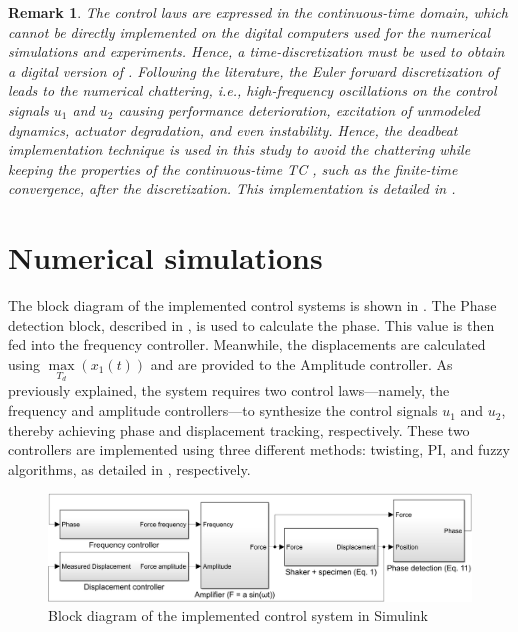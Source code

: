 \documentclass[lettersize,journal]{IEEEtran}
\newtheorem{remark}{Remark}
\begin{document}
\begin{remark} \label{R_chattering}
    The control laws  are expressed in the continuous-time domain, which cannot be directly implemented on the digital computers used for the numerical simulations and experiments. Hence, a time-discretization must be used to obtain a digital version of . Following the literature, the Euler forward discretization of  leads to the numerical chattering, {\em i.e.}, high-frequency oscillations on the control signals $u_1$ and $u_2$ causing performance deterioration, excitation of unmodeled dynamics, actuator degradation, and even instability. Hence, the deadbeat implementation technique \cite{MOJALLIZADEH_Franklin} is used in this study to avoid the chattering while keeping the properties of the continuous-time TC , such as the finite-time convergence, after the discretization. This implementation is detailed in .
\end{remark}


\section{Numerical simulations} \label{S_simulations}

The block diagram of the implemented control systems is shown in . The {\selectfont Phase detection} block, described in , is used to calculate the phase. This value is then fed into the {\selectfont frequency controller}. Meanwhile, the displacements are calculated using $\max\limits_{T_d}(x_1(t))$ and are provided to the {\selectfont Amplitude controller}. As previously explained, the system requires two control laws—namely, the frequency and amplitude controllers—to synthesize the control signals $u_1$ and $u_2$, thereby achieving phase and displacement tracking, respectively. These two controllers are implemented using three different methods: twisting, PI, and fuzzy algorithms, as detailed in , respectively.



\begin{figure}
    \centering    \includegraphics[width=\linewidth]{F_simulink.png}
    \caption{Block diagram of the implemented control system in {\selectfont Simulink} }
    \label{F_diagram}
\end{figure}
\end{document}
